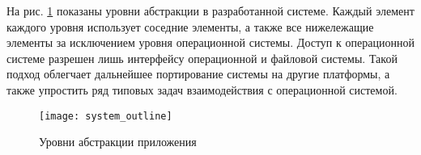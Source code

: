 На рис. \ref{ship_dfd} показаны уровни абстракции в разработанной системе. 
Каждый элемент каждого уровня использует соседние элементы, а также все нижележащие элементы за исключением уровня операционной системы. Доступ к операционной системе разрешен лишь интерфейсу операционной и файловой системы. Такой подход облегчает дальнейшее портирование системы на другие платформы, а также упростить ряд типовых задач взаимодействия с операционной системой.

\begin{figure}[ht]
	\begin{center}
	\texttt{[image: system\_outline]}
	\end{center}
	\caption{Уровни абстракции приложения}
	\label{ship_dfd}
\end{figure}



